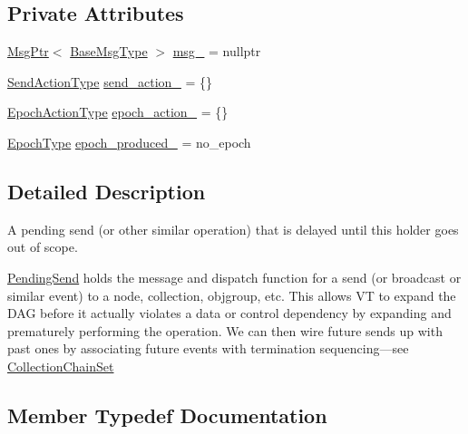\subsection*{Private Attributes}
\begin{DoxyCompactItemize}
\item 
\hyperlink{namespacevt_a9f5ebd62ee9d6dd8829e3e1cc4f858e9}{Msg\+Ptr}$<$ \hyperlink{namespacevt_a44d0d4e144748f2b19a1cfd962f50338}{Base\+Msg\+Type} $>$ \hyperlink{structvt_1_1messaging_1_1_pending_send_a6202f4243176b9189d9aef17aa108a36}{msg\+\_\+} = nullptr
\item 
\hyperlink{structvt_1_1messaging_1_1_pending_send_aa13248a342d68230048cde8e0756851c}{Send\+Action\+Type} \hyperlink{structvt_1_1messaging_1_1_pending_send_a0054d2fec8353438284dc02a28a73294}{send\+\_\+action\+\_\+} = \{\}
\item 
\hyperlink{structvt_1_1messaging_1_1_pending_send_a25131dc5a5e003dc65187edc97c23d1c}{Epoch\+Action\+Type} \hyperlink{structvt_1_1messaging_1_1_pending_send_a6b53bdc8c1eb674e724fd71bd1065034}{epoch\+\_\+action\+\_\+} = \{\}
\item 
\hyperlink{namespacevt_a81d11b28122d43bf9834577e4a06440f}{Epoch\+Type} \hyperlink{structvt_1_1messaging_1_1_pending_send_a77a8ad56dc73c0821c3fa4cef0b4c27a}{epoch\+\_\+produced\+\_\+} = no\+\_\+epoch
\end{DoxyCompactItemize}


\subsection{Detailed Description}
A pending send (or other similar operation) that is delayed until this holder goes out of scope. 

{\ttfamily \hyperlink{structvt_1_1messaging_1_1_pending_send}{Pending\+Send}} holds the message and dispatch function for a send (or broadcast or similar event) to a node, collection, objgroup, etc. This allows VT to expand the D\+AG before it actually violates a data or control dependency by expanding and prematurely performing the operation. We can then wire future sends up with past ones by associating future events with termination sequencing---see {\ttfamily \hyperlink{classvt_1_1messaging_1_1_collection_chain_set}{Collection\+Chain\+Set}} 

\subsection{Member Typedef Documentation}
\mbox{\label{structvt_1_1messaging_1_1_pending_send_a25131dc5a5e003dc65187edc97c23d1c}} 
